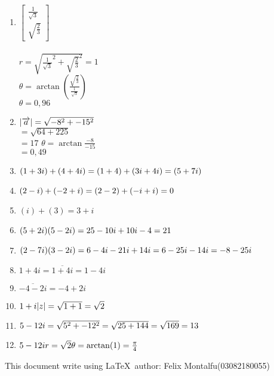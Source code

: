 \documentclass[a4paper]{article}
\begin{document}
\begin{enumerate}[1.]
        \item $\begin{bmatrix}\frac{1}{\sqrt{3}} \\ \sqrt{\frac{2}{3}}\end{bmatrix}$\\\\
        $r = \sqrt{\frac{1}{\sqrt{3}}^2 + \sqrt{\frac{2}{3}}^2}= 1$\\
        $\theta = \arctan (\frac{\sqrt{\frac{2}{3}}}{\frac{1}{\sqrt{3}}})$\\
        $\theta=0,96$

        \item $\abs{\overrightarrow{a}} = \sqrt{-8^2 + -15^2}$\\
        $= \sqrt{64 + 225}$\\
        $= 17$
        $\theta = \arctan{\frac{-8}{-15}}$\\
        $= 0,49$

        \item $(1+3i)+(4+4i)\\
        =(1+4)+(3i+4i)\\
        =(5+7i)$

        \item $(2-i)+(-2+i)\\
        =(2-2)+(-i+i)\\
        =0$

        \item $(i)+(3) = 3+i$
        
        \item $(5+2i)(5-2i)\\
        = 25 -10i +10i -4\\
        =21
        $

        \item $(2-7i)(3-2i)\\
        =6-4i-21i+14i\\
        =6-25i-14i\\
        =-8-25i
        $

        \item $1+4i
        =\overline{1+4i}
        =1-4i$

        \item $\overline{-4-2i} = -4+2i$
        
        \item $1+i\\
        \abs{z} = \sqrt{1+1}\\
        = \sqrt{2}
        $

        \item $5-12i
        =\sqrt{5^2 + -12^2}\\
        =\sqrt{25+144}\\
        =\sqrt{169}\\
        =13
        $

        \item $
        5-12i\\
        r = \sqrt{2}\\
        \theta = \arctan(1)\\
        =\frac{\pi}{4}
        $
    \end{enumerate}
    This document write using \LaTeX \ author: Felix Montalfu(03082180055) 
\end{document}

